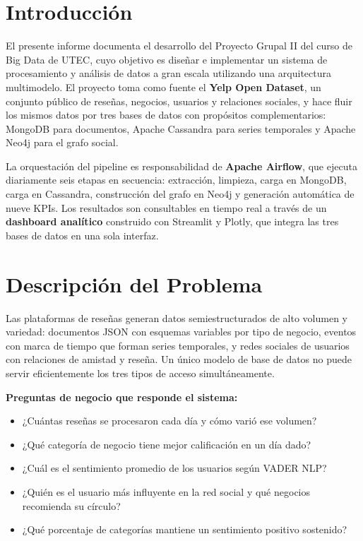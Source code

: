 \documentclass[12pt,a4paper]{article}
\begin{document}
\newpage
\tableofcontents
\newpage

\section{Introducción}

El presente informe documenta el desarrollo del Proyecto Grupal II del curso de Big Data
de UTEC, cuyo objetivo es diseñar e implementar un sistema de procesamiento y análisis
de datos a gran escala utilizando una arquitectura multimodelo. El proyecto toma como
fuente el \textbf{Yelp Open Dataset}, un conjunto público de reseñas, negocios, usuarios
y relaciones sociales, y hace fluir los mismos datos por tres bases de datos con propósitos
complementarios: MongoDB para documentos, Apache Cassandra para series temporales y
Apache Neo4j para el grafo social.

La orquestación del pipeline es responsabilidad de \textbf{Apache Airflow}, que ejecuta
diariamente seis etapas en secuencia: extracción, limpieza, carga en MongoDB, carga en
Cassandra, construcción del grafo en Neo4j y generación automática de nueve KPIs. Los
resultados son consultables en tiempo real a través de un \textbf{dashboard analítico}
construido con Streamlit y Plotly, que integra las tres bases de datos en una sola interfaz.

\section{Descripción del Problema}

Las plataformas de reseñas generan datos semiestructurados de alto volumen y variedad:
documentos JSON con esquemas variables por tipo de negocio, eventos con marca de tiempo
que forman series temporales, y redes sociales de usuarios con relaciones de amistad y
reseña. Un único modelo de base de datos no puede servir eficientemente los tres tipos
de acceso simultáneamente.

\textbf{Preguntas de negocio que responde el sistema:}
\begin{itemize}[noitemsep]
    \item ¿Cuántas reseñas se procesaron cada día y cómo varió ese volumen?
    \item ¿Qué categoría de negocio tiene mejor calificación en un día dado?
    \item ¿Cuál es el sentimiento promedio de los usuarios según VADER NLP?
    \item ¿Quién es el usuario más influyente en la red social y qué negocios recomienda su círculo?
    \item ¿Qué porcentaje de categorías mantiene un sentimiento positivo sostenido?
\end{itemize}
\end{document}
